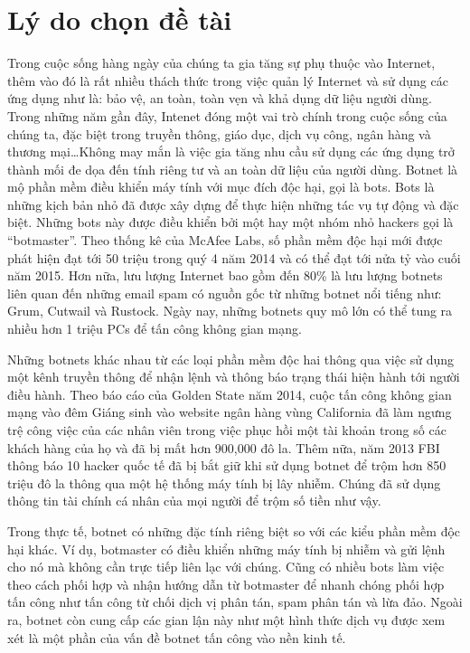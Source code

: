 

\clearpage


\section*{Lý do chọn đề tài}
Trong cuộc sống hàng ngày của chúng ta gia tăng sự phụ thuộc vào Internet, thêm
vào đó là rất nhiều thách thức trong việc quản lý Internet và sử dụng các ứng dụng như
là: bảo vệ, an toàn, toàn vẹn và khả dụng dữ liệu người dùng. Trong những năm gần đây,
Intenet đóng một vai trò chính trong cuộc sống của chúng ta, đặc biệt trong truyền thông,
giáo dục, dịch vụ công, ngân hàng và thương mại\dots Không may mắn là việc gia tăng nhu
cầu sử dụng các ứng dụng trở thành mối đe dọa đến tính riêng tư và an toàn dữ liệu của
người dùng. Botnet là mộ phần mềm điều khiển máy tính với mục đích độc hại, gọi là
bots. Bots là những kịch bản nhỏ đã được xây dựng để thực hiện những tác vụ tự động và
đặc biệt. Những bots này được điều khiển bởi một hay một nhóm nhỏ hackers gọi là
``botmaster''. Theo thống kê của McAfee Labs, số phần mềm độc hại mới được phát hiện
đạt tới 50 triệu trong quý 4 năm 2014 và có thể đạt tới nửa tỷ vào cuối năm 2015. Hơn
nữa, lưu lượng Internet bao gồm đến 80\% là lưu lượng botnets liên quan đến những email
spam có nguồn gốc từ những botnet nổi tiếng như: Grum, Cutwail và Rustock. Ngày nay,
những botnets quy mô lớn có thể tung ra nhiều hơn 1 triệu PCs để tấn công không gian
mạng.

Những botnets khác nhau từ các loại phần mềm độc hai thông qua việc sử dụng một
kênh truyền thông để nhận lệnh và thông báo trạng thái hiện hành tới người điều hành.
Theo báo cáo của Golden State năm 2014, cuộc tấn công không gian mạng vào đêm
Giáng sinh vào website ngân hàng vùng California đã làm ngưng trệ công việc của các
nhân viên trong việc phục hồi một tài khoản trong số các khách hàng của họ và đã bị mất
hơn 900,000 đô la. Thêm nữa, năm 2013 FBI thông báo 10 hacker quốc tế đã bị bắt giữ
khi sử dụng botnet để trộm hơn 850 triệu đô la thông qua một hệ thống máy tính bị lây
nhiễm. Chúng đã sử dụng thông tin tài chính cá nhân của mọi người để trộm số tiền như
vậy.

Trong thực tế, botnet có những đặc tính riêng biệt so với các kiểu phần mềm độc hại
khác. Ví dụ, botmaster có điều khiển những máy tính bị nhiễm và gửi lệnh cho nó mà
không cần trực tiếp liên lạc với chúng. Cũng có nhiều bots làm việc theo cách phối hợp
và nhận hướng dẫn từ botmaster để nhanh chóng phối hợp tấn công như tấn công từ chối
dịch vị phân tán, spam phân tán và lừa đảo. Ngoài ra, botnet còn cung cấp các gian lận
này như một hình thức dịch vụ được xem xét là một phần của vấn đề botnet tấn công vào
nền kinh tế.

